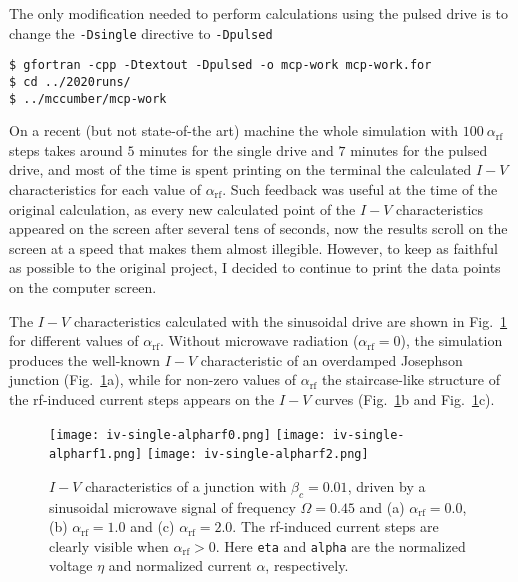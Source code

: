 The only modification needed to perform calculations using the pulsed drive is to change the \texttt{-Dsingle} directive to \texttt{-Dpulsed}

\begin{lstlisting}
$ gfortran -cpp -Dtextout -Dpulsed -o mcp-work mcp-work.for
$ cd ../2020runs/
$ ../mccumber/mcp-work
\end{lstlisting}


On a recent (but not state-of-the art) machine the whole simulation with $100~\alpha_\mathrm{rf}$ steps takes around $5$ minutes for the single drive and $7$ minutes for the pulsed drive, and most of the time is spent printing on the terminal the calculated $I - V$ characteristics for each value of $\alpha_\mathrm{rf}$. Such feedback was useful at the time of the original calculation, as every new calculated point of the $I - V$ characteristics appeared on the screen after several tens of seconds, now the results scroll on the screen at a speed that makes them almost illegible.
However, to keep as faithful as possible to the original project, I decided to continue to print the data points on the computer screen.

The $I - V$ characteristics calculated with the sinusoidal drive are shown in Fig.~\ref{fig:iv-single} for different values of $\alpha_\mathrm{rf}$.
Without microwave radiation ($\alpha_\mathrm{rf} = 0$), the simulation produces the well-known $I - V$ characteristic of an overdamped Josephson junction (Fig.~\ref{fig:iv-single}a), while for non-zero values of $\alpha_\mathrm{rf}$ the staircase-like structure of the rf-induced current steps appears on the $I - V$ curves (Fig.~\ref{fig:iv-single}b and Fig.~\ref{fig:iv-single}c).

\begin{figure}[tb]
{
	\fboxsep=0pt
	\mbox{\texttt{[image: iv-single-alpharf0.png]}}
	\hfill
	\mbox{\texttt{[image: iv-single-alpharf1.png]}}
	\hfill
	\mbox{\texttt{[image: iv-single-alpharf2.png]}}
}
	\caption{$I - V$ characteristics of a junction with $\beta_c = 0.01$, driven by a sinusoidal microwave signal of frequency $\Omega = 0.45$ and (a) $\alpha_\mathrm{rf} = 0.0$, (b) $\alpha_\mathrm{rf} = 1.0$ and (c) $\alpha_\mathrm{rf} = 2.0$. The rf-induced current steps are clearly visible when $\alpha_\mathrm{rf} > 0$. Here \texttt{eta} and \texttt{alpha} are the normalized voltage $\eta$ and normalized current $\alpha$, respectively.}
	\label{fig:iv-single}
\end{figure}


